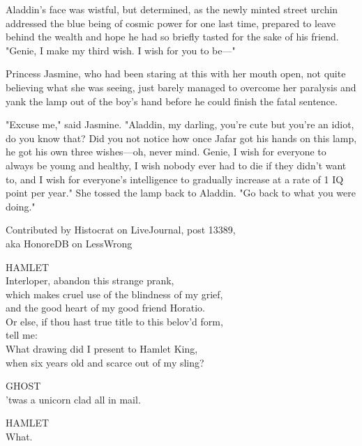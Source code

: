 \noindent{}Aladdin's face was wistful, but determined, as the newly minted street urchin
addressed the blue being of cosmic power for one last time, prepared to leave
behind the wealth and hope he had so briefly tasted for the sake of his friend.
"Genie, I make my third wish. I wish for you to be\mbox{---}"

Princess Jasmine, who had been staring at this with her mouth open, not quite
believing what she was seeing, just barely managed to overcome her paralysis
and yank the lamp out of the boy's hand before he could finish the fatal
sentence.

"Excuse me," said Jasmine. "Aladdin, my darling, you're cute but you're an
idiot, do you know that? Did you not notice how once Jafar got his hands on
this lamp, he got his own three wishes---oh, never mind. Genie, I wish for
everyone to always be young and healthy, I wish nobody ever had to die if they
didn't want to, and I wish for everyone's intelligence to gradually increase at
a rate of 1 IQ point per year." She tossed the lamp back to Aladdin. "Go back
to what you were doing."
\sbreak
{}
\begin{center}
    \small
    Contributed by Histocrat on LiveJournal, post 13389,\\ aka HonoreDB on LessWrong
\end{center}

\noindent{}HAMLET\\
Interloper, abandon this strange prank,\\
which makes cruel use of the blindness of my grief,\\
and the good heart of my good friend Horatio.\\
Or else, if thou hast true title to this belov'd form,\\
tell me:\\
What drawing did I present to Hamlet King,\\
when six years old and scarce out of my sling?

\bigskip
\noindent{}GHOST\\
'twas a unicorn clad all in mail.

\bigskip
\noindent{}HAMLET\\
What.

